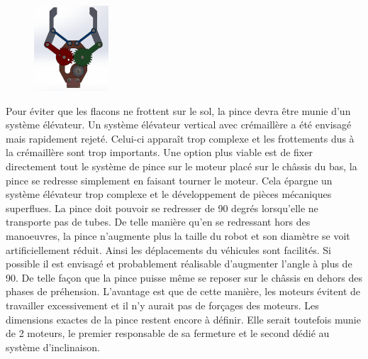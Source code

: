\documentclass[a4paper,11pt]{article}
\begin{document}
\begin{figure}[H]
\begin{minipage}[c]{.46\linewidth}
        \includegraphics[height = 120]{pince_ouv.png}
    \end{minipage}
\end{figure}

Pour éviter que les flacons ne frottent sur le sol, la pince devra être munie d'un système élévateur. Un système élévateur vertical avec crémaillère a été envisagé mais rapidement rejeté. Celui-ci apparaît trop complexe et les frottements dus à la crémaillère sont trop importants. Une option plus viable est de fixer directement tout le système de pince sur le moteur placé sur le châssis du bas, la pince se redresse simplement en faisant tourner le moteur. Cela épargne un système élévateur trop complexe et le développement de pièces mécaniques superflues. La pince doit pouvoir se redresser de 90 degrés lorsqu'elle ne transporte pas de tubes. De telle manière qu'en se redressant hors des manoeuvres, la pince n'augmente plus la taille du robot et son diamètre se voit artificiellement réduit. Ainsi les déplacements du véhicules sont facilités. Si possible il est envisagé et probablement réalisable d'augmenter l'angle à plus de 90\degree . De telle façon que la pince puisse même se reposer sur le châssis en dehors des phases de préhension. L'avantage est que de cette manière, les moteurs évitent de travailler excessivement et il n'y aurait pas de forçages des moteurs. Les dimensions exactes de la pince restent encore à définir. Elle serait toutefois munie de 2 moteurs, le premier responsable de sa fermeture et le second dédié au système d'inclinaison.
\end{document}

